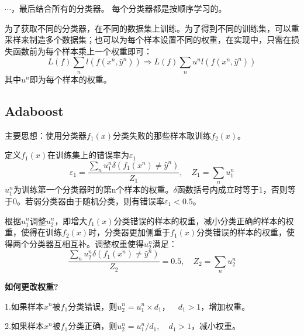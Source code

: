 \documentclass[UTF8]{ctexart} %
\begin{document}
			$\cdots$，最后结合所有的分类器。
			每个分类器都是按顺序学习的。
			
			为了获取不同的分类器，在不同的数据集上训练。为了得到不同的训练集，可以重采样来制造多个数据集；也可以为每个样本设置不同的权重，在实现中，只需在损失函数前为每个样本乘上一个权重即可：
			\[L(f)\sum_nl(f(x^n,\hat{y}^n))\Longrightarrow L(f)\sum_nu^nl(f(x^n,\hat{y}^n))\]
			其中$u^n$即为每个样本的权重。
		\subsection{Adaboost}
			主要思想：使用分类器$f_1(x)$分类失败的那些样本取训练$f_2(x)$。
			
			定义$f_1(x)$在训练集上的错误率为$\varepsilon_1$
			\[\varepsilon_1 = \frac{\sum_nu_1^n\delta(f_1(x^n)\neq\hat{y}^n)}{Z_1}, \quad Z_1=\sum_nu_1^n\]
			$u_1^n$为训练第一个分类器时的第n个样本的权重。$\delta$函数括号内成立时等于1，否则等于0。若弱分类器由于随机分类，则有错误率$\varepsilon_1<0.5$。
			
			根据$u_1^n$调整$u_2^n$，即增大$f_1(x)$分类错误的样本的权重，减小分类正确的样本的权重，使得在训练$f_2(x)$时，分类器更加侧重于$f_1(x)$分类错误的样本的权重，使得两个分类器互相互补。调整权重使得$u_2^n$满足：
			\[\frac{\sum_nu_2^n\delta(f_1(x^n)\neq\hat{y}^n)}{Z_2}=0.5, \quad Z_2=\sum_nu_2^n\]
			\begin{figure}[H]
			\end{figure}
			
			\textbf{如何更改权重?}
			
			\quad1.如果样本$x^n$被$f_1$分类错误，则$u_2^n=u_1^n\times d_1，\quad d_1>1$，增加权重。
			
			\quad2.如果样本$x^n$被$f_1$分类正确，则$u_2^n=u_1^n/d_1,\quad d_1>1$，减小权重。
			
\end{document}
